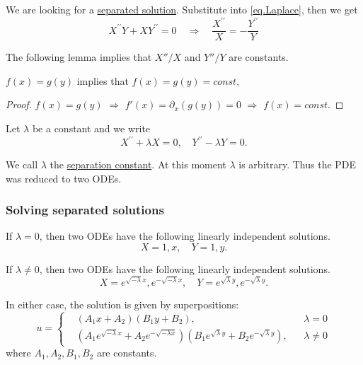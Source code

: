 We are looking for a \underline{separated solution}. Substitute into \eqref{eq.Laplace}, then we get 
\begin{equation*}
    X^{\prime \prime} Y+X Y^{\prime \prime}=0 \quad\Rightarrow\quad
    \frac{X^{\prime \prime}}{X}= -\frac{Y^{\prime \prime}}{Y}
\end{equation*}

The following lemma implies that $X''/X$ and $Y''/Y$ are constants.

\begin{lemma}[]\label{lem.separation_var}
    $f(x) = g(y)$ implies that $f(x) = g(y) = \textit{const}$,
\end{lemma}
\begin{proof}
    $f(x) = g(y)$ $\Rightarrow$ $f'(x) = \partial_x (g(y)) = 0$ $\Rightarrow$ $f(x) = \textit{const}$.
\end{proof}

Let $\lambda$ be a constant and we write
\begin{equation*}
    X^{\prime \prime}+\lambda X=0, \quad Y^{\prime \prime}-\lambda Y=0 .
\end{equation*}

We call $\lambda$ the \underline{separation constant}. At this moment $\lambda$ is arbitrary. Thus the PDE was reduced to two ODEs.

\subsubsection{Solving separated solutions}

If $\lambda=0$, then two ODEs have the following linearly independent solutions.
\begin{equation}\label{eq.separated_basis_0}
X=1, x, \quad Y=1, y.
\end{equation}

If $\lambda \neq 0$, then two ODEs have the following linearly independent solutions.
\begin{equation}\label{eq.separated_basis}
X=e^{\sqrt{-\lambda} x}, e^{-\sqrt{-\lambda} x}, \quad Y=e^{\sqrt{\lambda} y}, e^{-\sqrt{\lambda} y} .
\end{equation}

In either case, the solution is given by superpositions:
\begin{equation}\label{eq.basis_separated}
u=
\left\{\begin{aligned}
&\left(A_1 x+A_2\right)\left(B_1 y+B_2\right), && \lambda=0 
\\
&\left(A_1 e^{\sqrt{-\lambda} x}+A_2 e^{-\sqrt{-\lambda x}}\right)\left(B_1 e^{\sqrt{\lambda} y}+B_2 e^{-\sqrt{\lambda} y}\right), && \lambda \neq 0
\end{aligned}\right.
\end{equation}
where $A_1, A_2, B_1, B_2$ are constants. 

